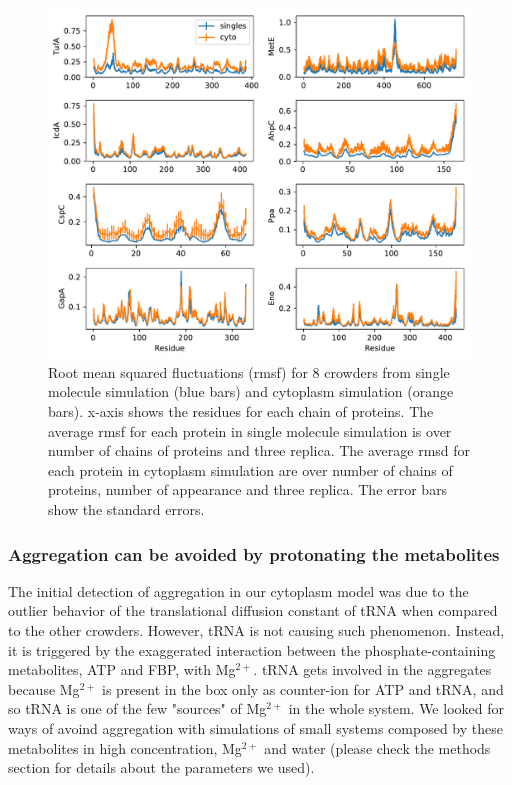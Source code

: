 \documentclass[journal=jacsat,manuscript=article]{achemso}
\begin{document}
\begin{figure}[H]
\includegraphics[scale=0.5]{rmsf_2cols.pdf}
\caption{Root mean squared fluctuations (rmsf) for 8 crowders from single molecule simulation (blue bars) and cytoplasm simulation (orange bars). x-axis shows the residues for each chain of proteins. The average rmsf for each protein in single molecule simulation is over number of chains of proteins and three replica. The average rmsd for each protein in cytoplasm simulation are over number of chains of proteins, number of appearance and three replica. The error bars show the standard errors.\textbf{\color{red}{CAN YOU ADD THE PROTEIN NAME AS A LABEL INSIDE EACH PLOT? I THINK THE VARIABLE NAME SHOULD BE IN THE Y-AXIS (RMSF NM2)}}}
\label{fig:rmsf}
\end{figure}






\subsubsection{Aggregation can be avoided by protonating the metabolites}

The initial detection of aggregation in our cytoplasm model was due to the outlier behavior of the translational diffusion constant of tRNA when compared to the other crowders. However, tRNA is not causing such phenomenon. Instead, it is triggered by the exaggerated interaction between the phosphate-containing metabolites, ATP and FBP, with Mg$^{2+}$. tRNA gets involved in the aggregates because Mg$^{2+}$ is present in the box only as counter-ion for ATP and tRNA, and so tRNA is one of the few "sources" of Mg$^{2+}$ in the whole system. We looked for ways of avoind aggregation with simulations of small systems composed by these metabolites in high concentration, Mg$^{2+}$ and water (please check the methods section for details about the parameters we used).
\end{document}
